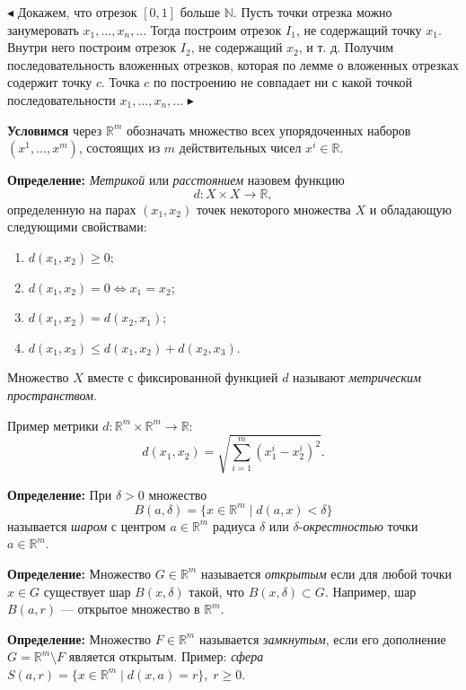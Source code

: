\documentclass[12pt]{article}
\begin{document}
  $\blacktriangleleft$ Докажем, что отрезок $[0,1]$ больше $\mathbb{N}$. Пусть точки отрезка можно занумеровать $x_1, ..., x_n, ...$ Тогда построим отрезок $I_1$, не содержащий точку $x_1$. Внутри него построим отрезок $I_2$, не содержащий $x_2$, и т. д. Получим последовательность вложенных отрезков, которая по лемме о вложенных отрезках содержит точку $c$. Точка $c$ по построению не совпадает ни с какой точкой последовательности $x_1, ..., x_n, ...$ $\blacktriangleright$ 
   
   \textbf{Условимся} через $ \mathbb{R}^m $ обозначать множество всех упорядоченных наборов $ (x^1, ..., x^m) $, состоящих из $m$ действительных чисел $x^i \in \mathbb{R}$. 
   
   \textbf{Определение:} \textit{Метрикой} или \textit{расстоянием} назовем функцию 
   $$ 
   d:X \times X \rightarrow \mathbb{R}, 
   $$ определенную на парах $ (x_1, x_2) $ точек некоторого множества $X$ и обладающую следующими свойствами:
   \begin{enumerate}
    \item $d(x_1, x_2) \geq 0$;
    \item $d(x_1, x_2) = 0 \Leftrightarrow x_1 = x_2$;
    \item $d(x_1, x_2) = d(x_2, x_1)$;
    \item $d(x_1, x_3) \leq d(x_1, x_2) + d(x_2, x_3)$.
   \end{enumerate}
   
   Множество $X$ вместе с фиксированной функцией $d$ называют\textit{ метрическим пространством}.
   
   Пример метрики $d: \mathbb{R}^m \times \mathbb{R}^m  \rightarrow \mathbb{R}$:
   $$
   	d(x_1, x_2) = \sqrt{\sum_{i=1}^m (x_1^i - x_2^i)^2}.
   $$
   
   
  \textbf{ Определение:} При $\delta > 0 $ множество 
  $$
  	B(a, \delta) = \{ x \in \mathbb{R}^m \; | \;  d(a,x) < \delta \}
  $$
   называется \textit{шаром} с центром $a \in \mathbb{R}^m$ радиуса $\delta$ или $\delta$-\textit{окрестностью} точки  $a \in \mathbb{R}^m$.
   
   \textbf{Определение:} Множество $G \in \mathbb{R}^m$ называется \textit{открытым} если для любой точки $x \in G$ существует шар $B(x,\delta)$ такой, что $B(x, \delta) \subset G$. Например, шар $B(a,r)$ --- открытое множество в $\mathbb{R}^m$. 
   
    \textbf{Определение:} Множество $F \in \mathbb{R}^m$ называется \textit{замкнутым}, если его дополнение $G = \mathbb{R}^m \setminus F$ является открытым. Пример: \textit{сфера} $S(a,r) = \{ x\in \mathbb{R}^m \; | \; d(x, a) = r\}, \; r \geq 0$.
    
\end{document}
